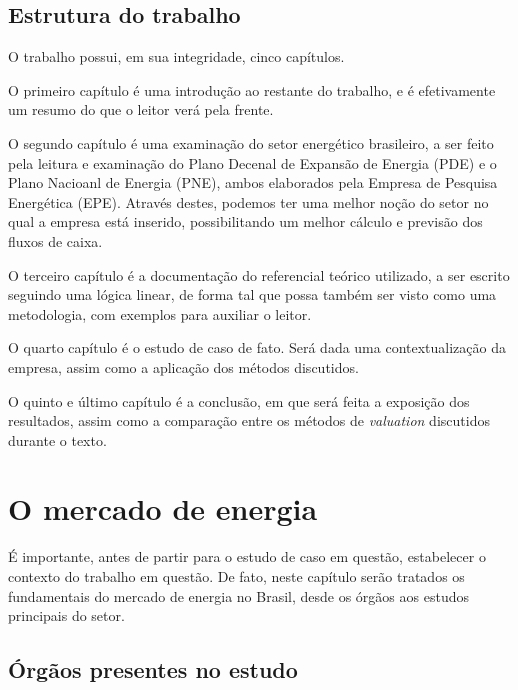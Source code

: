 \documentclass[grad,numbers]{coppe}
\begin{document}
  \hypertarget{estrutura-do-trabalho}{%
  \section{Estrutura do trabalho}\label{estrutura-do-trabalho}}
  
  O trabalho possui, em sua integridade, cinco capítulos.
  
  O primeiro capítulo é uma introdução ao restante do trabalho, e é efetivamente um resumo do que o leitor verá pela frente.
  
  O segundo capítulo é uma examinação do setor energético brasileiro, a ser feito pela leitura e examinação do Plano Decenal de Expansão de Energia (PDE) e o Plano Nacioanl de Energia (PNE), ambos elaborados pela Empresa de Pesquisa Energética (EPE). Através destes, podemos ter uma melhor noção do setor no qual a empresa está inserido, possibilitando um melhor cálculo e previsão dos fluxos de caixa.
  
  O terceiro capítulo é a documentação do referencial teórico utilizado, a ser escrito seguindo uma lógica linear, de forma tal que possa também ser visto como uma metodologia, com exemplos para auxiliar o leitor.
  
  O quarto capítulo é o estudo de caso de fato. Será dada uma contextualização da empresa, assim como a aplicação dos métodos discutidos.
  
  O quinto e último capítulo é a conclusão, em que será feita a exposição dos resultados, assim como a comparação entre os métodos de \emph{valuation} discutidos durante o texto.
  
  \hypertarget{o-mercado-de-energia}{%
  \chapter{O mercado de energia}\label{o-mercado-de-energia}}
  
  É importante, antes de partir para o estudo de caso em questão, estabelecer o contexto do trabalho em questão. De fato, neste capítulo serão tratados os fundamentais do mercado de energia no Brasil, desde os órgãos aos estudos principais do setor.
  
  \hypertarget{uxf3rguxe3os-presentes-no-estudo}{%
  \section{Órgãos presentes no estudo}\label{uxf3rguxe3os-presentes-no-estudo}}
  
\end{document}
